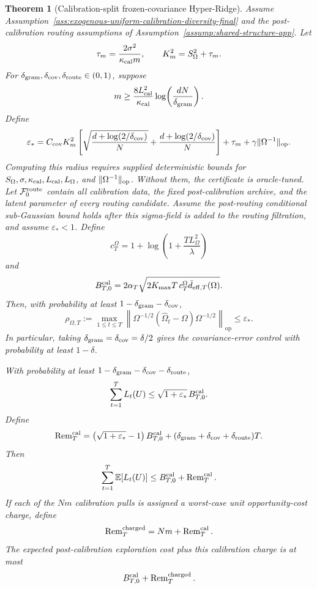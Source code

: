 \documentclass{article} %
\newtheorem{theorem}{Theorem}
\begin{document}
\begin{theorem}[Calibration-split frozen-covariance Hyper-Ridge]
Assume Assumption~\ref{ass:exogenous-uniform-calibration-diversity-final} and
the post-calibration routing assumptions of
Assumption~\ref{assump:shared-structure-app}.  Let
\[
\tau_m=\frac{2\sigma^2}{\kappa_{\rm cal}m},
\qquad
K_m^2=S_\Omega^2+\tau_m.
\]
For
\(\delta_{\rm gram},\delta_{\rm cov},\delta_{\rm route}\in(0,1)\), suppose
\[
m
\ge
\frac{8L_{\rm cal}^2}{\kappa_{\rm cal}}
\log\!\left(\frac{dN}{\delta_{\rm gram}}\right).
\]
Define
\[
\varepsilon_*
=
C_{\rm cov}K_m^2
\left[
\sqrt{\frac{d+\log(2/\delta_{\rm cov})}{N}}
+
\frac{d+\log(2/\delta_{\rm cov})}{N}
\right]
+
\tau_m
+
\gamma\|\Omega^{-1}\|_{\mathrm{op}}.
\]
Computing this radius requires supplied deterministic bounds for
\(S_\Omega,\sigma,\kappa_{\rm cal},L_{\rm cal},L_\Omega\), and
\(\|\Omega^{-1}\|_{\rm op}\). Without them, the certificate is oracle-tuned.
Let \(\mathcal F_0^{\rm route}\) contain all calibration data, the fixed
post-calibration archive, and the latent parameter of every routing candidate.
Assume the post-routing conditional sub-Gaussian
bound holds after this sigma-field is added to the routing filtration, and
assume \(\varepsilon_*<1\). Define
\[
c_T^\Omega
=
1+\log\!\left(1+\frac{TL_\Omega^2}{\lambda}\right)
\]
and
\[
B_{T,0}^{\rm cal}
=
2\alpha_T
\sqrt{
2K_{\max}T\,c_T^\Omega
\bar d_{\mathrm{eff},T}(\Omega)
}.
\]
Then, with probability at least
\(1-\delta_{\rm gram}-\delta_{\rm cov}\),
\[
\rho_{\Omega,T}
:=
\max_{1\le t\le T}
\left\|
\Omega^{-1/2}(\widehat\Omega_t-\Omega)\Omega^{-1/2}
\right\|_{\mathrm{op}}
\le
\varepsilon_*.
\]
In particular, taking \(\delta_{\rm gram}=\delta_{\rm cov}=\delta/2\) gives the
covariance-error control with probability at least \(1-\delta\).

With probability at least
\(1-\delta_{\rm gram}-\delta_{\rm cov}-\delta_{\rm route}\),
\[
\sum_{t=1}^T L_t(U)
\le
\sqrt{1+\varepsilon_*}\,B_{T,0}^{\rm cal}.
\]
Define
\[
\operatorname{Rem}_T^{\rm cal}
=
\left(\sqrt{1+\varepsilon_*}-1\right)B_{T,0}^{\rm cal}
+
(\delta_{\rm gram}+\delta_{\rm cov}+\delta_{\rm route})T.
\]
Then
\[
\sum_{t=1}^T\mathbb{E}[L_t(U)]
\le
B_{T,0}^{\rm cal}
+
\operatorname{Rem}_T^{\rm cal}.
\]
If each of the \(Nm\) calibration pulls is assigned a worst-case unit
opportunity-cost charge, define
\[
\operatorname{Rem}_T^{\rm charged}
=
Nm+\operatorname{Rem}_T^{\rm cal}.
\]
The expected post-calibration exploration cost plus this calibration charge is
at most
\[
B_{T,0}^{\rm cal}
+
\operatorname{Rem}_T^{\rm charged}.
\]


\end{theorem}
\end{document}
